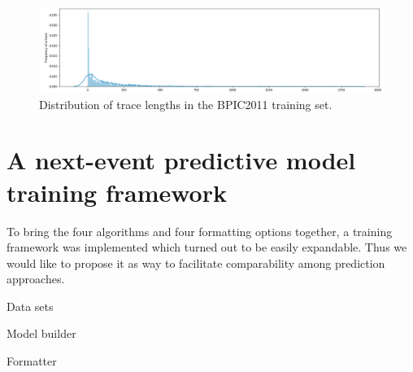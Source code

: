 \begin{figure}
    \centering
    \includegraphics[width=\textwidth]{gfx/frequency-distribution.png}
    \caption{Distribution of trace lengths in the BPIC2011 training set.}
    \label{fig:bpic2011-length-distribution}
\end{figure}

\section{A next-event predictive model training framework}
\label{sec:contrib:training-framework}
To bring the four algorithms and four formatting options together, a training framework was implemented which turned out to be easily expandable. Thus we would like to propose it as way to facilitate comparability among prediction approaches.

Data sets

Model builder

Formatter